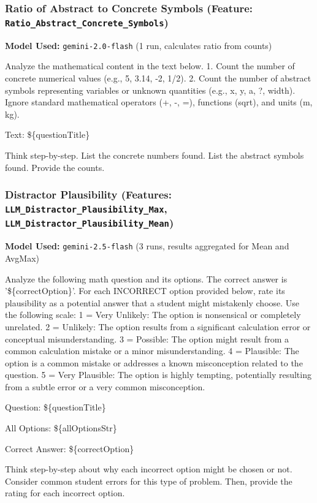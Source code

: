 \documentclass[
    a4paper, %
    10pt, %
    twoside, %
]{LTJournalArticle}
\begin{document}
\subsubsection{Ratio of Abstract to Concrete Symbols (Feature: \texttt{Ratio\_Abstract\_Concrete\_Symbols})}
\label{app:prompt_abstract_ratio}
\textbf{Model Used:} \texttt{gemini-2.0-flash} (1 run, calculates ratio from counts)
\begin{promptbox}
Analyze the mathematical content in the text below.
1. Count the number of concrete numerical values (e.g., 5, 3.14, -2, 1/2).
2. Count the number of abstract symbols representing variables or unknown quantities (e.g., x, y, a, ?, width).
Ignore standard mathematical operators (+, -, =), functions (sqrt), and units (m, kg).

Text:
\$\{questionTitle\}

Think step-by-step. List the concrete numbers found. List the abstract symbols found. Provide the counts.
\end{promptbox}

\subsubsection{Distractor Plausibility (Features: \texttt{LLM\_Distractor\_Plausibility\_Max}, \texttt{LLM\_Distractor\_Plausibility\_Mean})}
\label{app:prompt_distractor_plausibility}
\textbf{Model Used:} \texttt{gemini-2.5-flash} (3 runs, results aggregated for Mean and AvgMax)
\begin{promptbox}
Analyze the following math question and its options. The correct answer is '\$\{correctOption\}'.
For each INCORRECT option provided below, rate its plausibility as a potential answer that a student might mistakenly choose.
Use the following scale:
1 = Very Unlikely: The option is nonsensical or completely unrelated.
2 = Unlikely: The option results from a significant calculation error or conceptual misunderstanding.
3 = Possible: The option might result from a common calculation mistake or a minor misunderstanding.
4 = Plausible: The option is a common mistake or addresses a known misconception related to the question.
5 = Very Plausible: The option is highly tempting, potentially resulting from a subtle error or a very common misconception.

Question:
\$\{questionTitle\}

All Options:
\$\{allOptionsStr\}

Correct Answer: \$\{correctOption\}

Think step-by-step about why each incorrect option might be chosen or not. Consider common student errors for this type of problem. Then, provide the rating for each incorrect option.
\end{promptbox}
\end{document}
